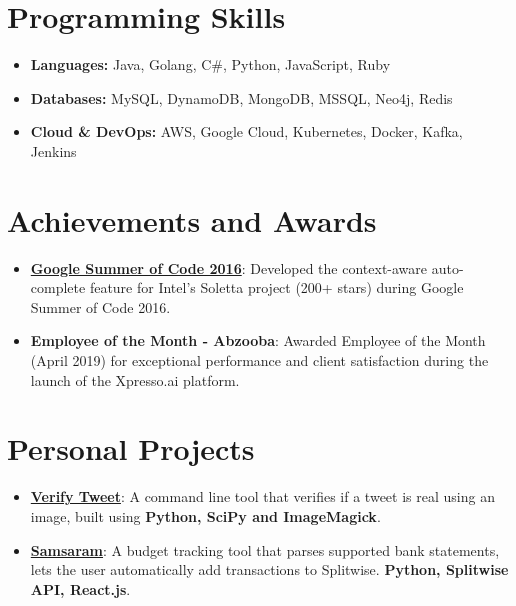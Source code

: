 \documentclass[letterpaper,11pt]{article}
\newcommand{\resumeItem}[2]{
  \item\small{
    \textbf{#1}{: #2 \vspace{-2pt}}
  }
}
\newcommand{\resumeSubItem}[2]{\resumeItem{#1}{#2}\vspace{-4pt}}
\newcommand{\resumeSubHeadingListStart}{\begin{itemize}[leftmargin=*]}
\newcommand{\resumeSubHeadingListEnd}{\end{itemize}}
\begin{document}

\section{Programming Skills}
 \resumeSubHeadingListStart
    \item{
     \textbf{Languages: }{Java, Golang, C\#, Python, JavaScript, Ruby}
    }
    \item{
      \textbf{Databases: }{MySQL, DynamoDB, MongoDB, MSSQL, Neo4j, Redis}
    }
    \item{
     \textbf{Cloud \& DevOps: }{AWS, Google Cloud, Kubernetes, Docker, Kafka, Jenkins}
    }
 \resumeSubHeadingListEnd

\section{Achievements and Awards}
  \resumeSubHeadingListStart
    \resumeSubItem{\href{https://summerofcode.withgoogle.com/archive/2016/projects/4536824152195072/}{Google Summer of Code 2016}}
      {Developed the context-aware auto-complete feature for Intel's Soletta project (200+ stars) during Google Summer of Code 2016.}
    \resumeSubItem{Employee of the Month - Abzooba}
      {Awarded Employee of the Month (April 2019) for exceptional performance and client satisfaction during the launch of the Xpresso.ai platform.}
  \resumeSubHeadingListEnd

\section{Personal Projects}
\resumeSubHeadingListStart
  \resumeSubItem{\href{https://github.com/preetham/verifytweet}{Verify Tweet}}
    {A command line tool that verifies if a tweet is real using an image, built using \textbf{Python, SciPy and ImageMagick}.}
  \resumeSubItem{\href{https://github.com/preetham/samsaram-be}{Samsaram}}
    {A budget tracking tool that parses supported bank statements, lets the user automatically add transactions to Splitwise. \textbf{Python, Splitwise API, React.js}.}
\resumeSubHeadingListEnd
\end{document}

